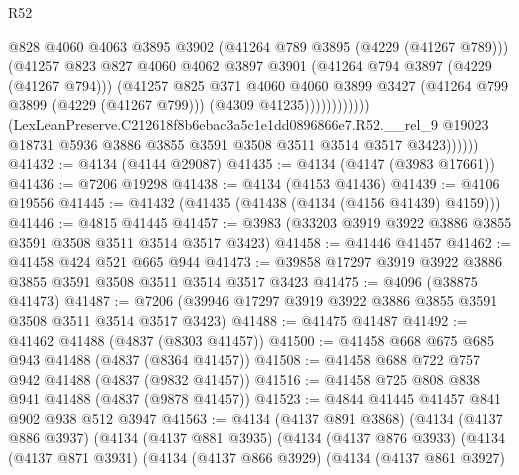 \begin{lexlean}{R52}
\begin{coremodule}
                                @828
                                @4060
                                @4063
                                @3895
                                @3902
                                (@41264 @789 @3895 (@4229 (@41267 @789)))
                                (@41257
                                  @823
                                  @827
                                  @4060
                                  @4062
                                  @3897
                                  @3901
                                  (@41264 @794 @3897 (@4229 (@41267 @794)))
                                  (@41257
                                    @825
                                    @371
                                    @4060
                                    @4060
                                    @3899
                                    @3427
                                    (@41264 @799 @3899 (@4229 (@41267 @799)))
                                    (@4309 @41235))))))))))))
              (LexLeanPreserve.C212618f8b6ebac3a5c1e1dd0896866e7.R52.__rel_9
                @19023
                @18731
                @5936
                @3886
                @3855
                @3591
                @3508
                @3511
                @3514
                @3517
                @3423))))))
@41432 := @4134 (@4144 @29087)
@41435 := @4134 (@4147 (@3983 @17661))
@41436 := @7206 @19298
@41438 := @4134 (@4153 @41436)
@41439 := @4106 @19556
@41445 := @41432 (@41435 (@41438 (@4134 (@4156 @41439) @4159)))
@41446 := @4815 @41445
@41457 := @3983 (@33203 @3919 @3922 @3886 @3855 @3591 @3508 @3511 @3514 @3517 @3423)
@41458 := @41446 @41457
@41462 := @41458 @424 @521 @665 @944
@41473 := @39858 @17297 @3919 @3922 @3886 @3855 @3591 @3508 @3511 @3514 @3517 @3423
@41475 := @4096 (@38875 @41473)
@41487 := @7206 (@39946 @17297 @3919 @3922 @3886 @3855 @3591 @3508 @3511 @3514 @3517 @3423)
@41488 := @41475 @41487
@41492 := @41462 @41488 (@4837 (@8303 @41457))
@41500 := @41458 @668 @675 @685 @943 @41488 (@4837 (@8364 @41457))
@41508 := @41458 @688 @722 @757 @942 @41488 (@4837 (@9832 @41457))
@41516 := @41458 @725 @808 @838 @941 @41488 (@4837 (@9878 @41457))
@41523 := @4844 @41445 @41457 @841 @902 @938 @512 @3947
@41563 := @4134
    (@4137 @891 @3868)
    (@4134
      (@4137 @886 @3937)
      (@4134
        (@4137 @881 @3935)
        (@4134
          (@4137 @876 @3933)
          (@4134
            (@4137 @871 @3931)
            (@4134
              (@4137 @866 @3929)
              (@4134
                (@4137 @861 @3927)

\end{coremodule}
\end{lexlean}
